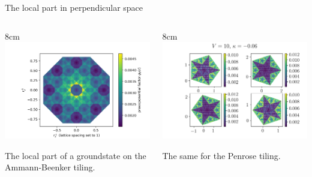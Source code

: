 \documentclass[xcolor=x11names,compress,professionalfonts, aspectratio=169]{beamer}
\renewcommand{\(}{\begin{columns}}
\renewcommand{\)}{\end{columns}}
\newcommand{\<}[1]{\begin{column}{#1}}
\renewcommand{\>}{\end{column}}
\begin{document}
\begin{frame}{The local part in perpendicular space}
\begin{columns}
\<{8cm}
\centering
\includegraphics[scale=.5]{img/SKK_cake_7_perp_VcustomA_1p8.png}

The local part of a groundstate on the Ammann-Beenker tiling.
\>
\<{8cm}
\centering
\includegraphics[scale=.5]{img/SKK_Penrose_cake_V_10_12_perp.png}

The same for the Penrose tiling.
\>
\end{columns}
\end{frame}
\end{document}
